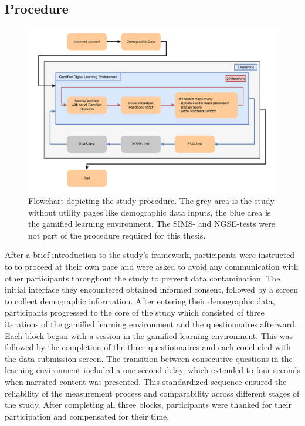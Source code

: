 \subsection{Procedure}
\begin{figure}[H]
  \centering
  \includegraphics[width=\textwidth]{img/Procedure.pdf}
  \caption{Flowchart depicting the study procedure. The grey area is the study without utility pages like demographic data inputs, the blue area is the gamified learning environment. The SIMS- and NGSE-tests were not part of the procedure required for this thesis.}
  \label{fig:procedureFlowchart}
\end{figure}
After a brief introduction to the study's framework, participants were instructed to to proceed at their own pace and were asked to avoid any communication with other participants throughout the study to prevent data contamination.
The initial interface they encountered obtained informed consent, followed by a screen to collect demographic information.
After entering their demographic data, participants progressed to the core of the study which consisted of three iterations of the gamified learning environment and the questionnaires afterward.
Each block began with a session in the gamified learning environment.
This was followed by the completion of the three questionnaires and each concluded with the data submission screen.
The transition between consecutive questions in the learning environment included a one-second delay, which extended to four seconds when narrated content was presented.
This standardized sequence ensured the reliability of the measurement process and comparability across different stages of the study.
After completing all three blocks, participants were thanked for their participation and compensated for their time.

